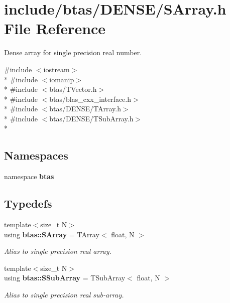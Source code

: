 \section{include/btas/\-D\-E\-N\-S\-E/\-S\-Array.h File Reference}
\label{de/d0d/SArray_8h}


Dense array for single precision real number.  


{\ttfamily \#include $<$iostream$>$}\\*
{\ttfamily \#include $<$iomanip$>$}\\*
{\ttfamily \#include $<$btas/\-T\-Vector.\-h$>$}\\*
{\ttfamily \#include $<$btas/blas\-\_\-cxx\-\_\-interface.\-h$>$}\\*
{\ttfamily \#include $<$btas/\-D\-E\-N\-S\-E/\-T\-Array.\-h$>$}\\*
{\ttfamily \#include $<$btas/\-D\-E\-N\-S\-E/\-T\-Sub\-Array.\-h$>$}\\*
\subsection*{Namespaces}
\begin{DoxyCompactItemize}
\item 
namespace {\bf btas}
\end{DoxyCompactItemize}
\subsection*{Typedefs}
\begin{DoxyCompactItemize}
\item 
{\footnotesize template$<$size\-\_\-t N$>$ }\\using {\bf btas\-::\-S\-Array} = T\-Array$<$ float, N $>$
\begin{DoxyCompactList}\small\item\em Alias to single precision real array. \end{DoxyCompactList}\item 
{\footnotesize template$<$size\-\_\-t N$>$ }\\using {\bf btas\-::\-S\-Sub\-Array} = T\-Sub\-Array$<$ float, N $>$
\begin{DoxyCompactList}\small\item\em Alias to single precision real sub-\/array. \end{DoxyCompactList}\end{DoxyCompactItemize}
